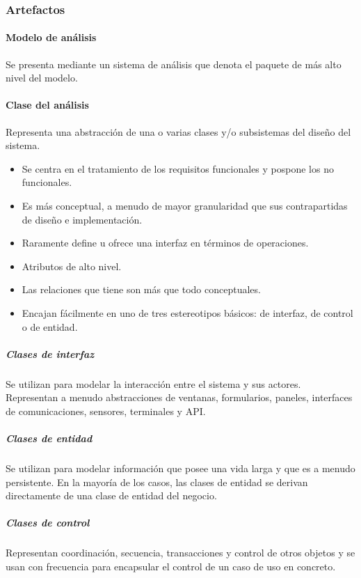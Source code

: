 \subsubsection{Artefactos}
\paragraph{Modelo de análisis}
Se presenta mediante un sistema de análisis que denota el paquete de más alto nivel del modelo.
\paragraph{Clase del análisis}
Representa una abstracción de una o varias clases y/o subsistemas del diseño del sistema.\\
\begin{itemize}
\item Se centra en el tratamiento de los requisitos funcionales y pospone los no funcionales.
\item Es más conceptual, a menudo de mayor granularidad que sus contrapartidas de diseño e implementación.
\item Raramente define u ofrece una interfaz en términos de operaciones.
\item Atributos de alto nivel.
\item Las relaciones que tiene son más que todo conceptuales.
\item Encajan fácilmente en uno de tres estereotipos básicos: de interfaz, de control o de entidad.
\end{itemize}
\subparagraph{Clases de interfaz}
Se utilizan para modelar la interacción entre el sistema y sus actores. Representan a menudo abstracciones de ventanas, formularios, paneles, interfaces de comunicaciones, sensores, terminales y API.
\subparagraph{Clases de entidad}
Se utilizan para modelar información que posee una vida larga y que es a menudo persistente. En la mayoría de los casos, las clases de entidad se derivan directamente de una clase de entidad del negocio.
\subparagraph{Clases de control}
Representan coordinación, secuencia, transacciones y control de otros objetos y se usan con frecuencia para encapsular el control de un caso de uso en concreto.
